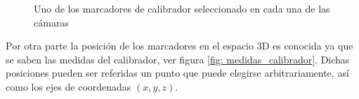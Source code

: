 \begin{figure}[ht!]
      
      \caption{Uno de los marcadores de calibrador seleccionado en cada una de las cámaras}
      \label{fig: vistas_calibrador}      
\end{figure}


Por otra parte la posición de los marcadores en el espacio 3D es conocida ya que se saben las medidas del calibrador, ver figura \ref{fig: medidas_calibrador}. Dichas posiciones pueden ser referidas un punto que puede elegirse arbitrariamente, así como los ejes de coordenadas $(x,y,z)$.

